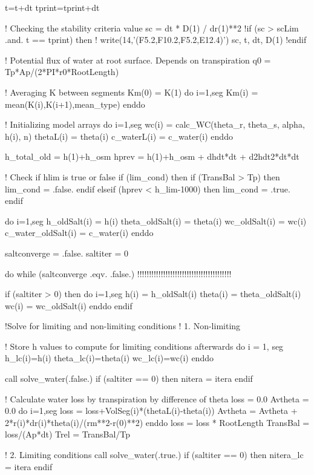   t=t+dt
  tprint=tprint+dt

  ! Checking the stability criteria value
  sc = dt * D(1) / dr(1)**2
  !if (sc > scLim .and. t == tprint) then
  !  write(14,'(F5.2,F10.2,F5.2,E12.4)') sc, t, dt, D(1)
  !endif
  
  ! Potential flux of water at root surface. Depends on transpiration
  q0 = Tp*Ap/(2*PI*r0*RootLength)

  ! Averaging K between segments
  Km(0) = K(1)
  do i=1,seg
    Km(i) = mean(K(i),K(i+1),mean_type)
  enddo

  ! Initializing model arrays
  do i=1,seg
    wc(i) = calc_WC(theta_r, theta_s, alpha, h(i), n)
    thetaL(i) = theta(i)
    c_waterL(i) = c_water(i)
  enddo

  h_total_old = h(1)+h_osm
  hprev = h(1)+h_osm + dhdt*dt + d2hdt2*dt*dt

  ! Check if hlim is true or false
  if (lim_cond) then
    if (TransBal > Tp) then
      lim_cond = .false.
    endif
  elseif (hprev < h_lim-1000) then
    lim_cond = .true.
  endif

  do i=1,seg
    h_oldSalt(i) = h(i)
    theta_oldSalt(i) = theta(i)
    wc_oldSalt(i) = wc(i)
    c_water_oldSalt(i) = c_water(i)
  enddo

  saltconverge = .false.
  saltiter = 0

  do while (saltconverge .eqv. .false.) !!!!!!!!!!!!!!!!!!!!!!!!!!!!!!!!!!!!!!!!
    
    if (saltiter > 0) then
      do i=1,seg
        h(i) = h_oldSalt(i)
        theta(i) = theta_oldSalt(i)
        wc(i) = wc_oldSalt(i)
      enddo
    endif

    !Solve for limiting and non-limiting conditions
    ! 1. Non-limiting

    ! Store h values to compute for limiting conditions afterwards
    do i = 1, seg
      h_lc(i)=h(i)
      theta_lc(i)=theta(i)
      wc_lc(i)=wc(i)
    enddo
    
    call solve_water(.false.)
    if (saltiter == 0) then
      nitera = itera
    endif
    
    ! Calculate water loss by transpiration by difference of theta
    loss = 0.0
    Avtheta = 0.0
    do i=1,seg
      loss = loss+VolSeg(i)*(thetaL(i)-theta(i))
      Avtheta = Avtheta + 2*r(i)*dr(i)*theta(i)/(rm**2-r(0)**2)
    enddo
    loss = loss * RootLength
    TransBal = loss/(Ap*dt)
    Trel = TransBal/Tp

    ! 2. Limiting conditions
    call solve_water(.true.)
    if (saltiter == 0) then
      nitera_lc = itera
    endif

